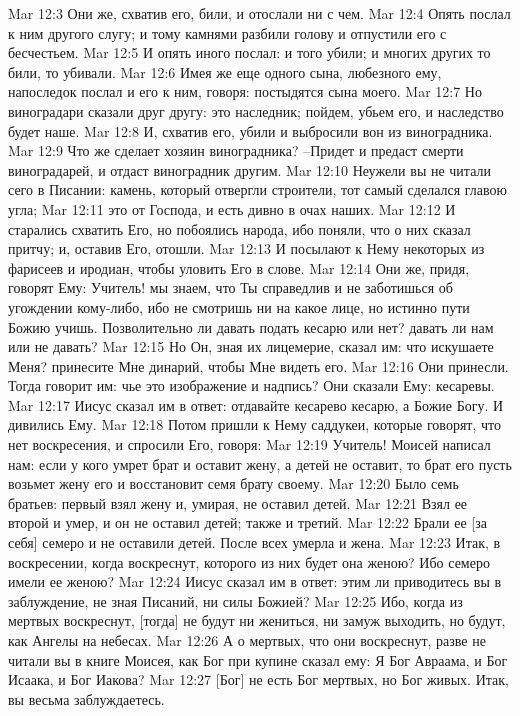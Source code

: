 Mar 12:3  Они же, схватив его, били, и отослали ни с чем.
Mar 12:4  Опять послал к ним другого слугу; и тому камнями разбили голову и отпустили его с бесчестьем.
Mar 12:5  И опять иного послал: и того убили; и многих других то били, то убивали.
Mar 12:6  Имея же еще одного сына, любезного ему, напоследок послал и его к ним, говоря: постыдятся сына моего.
Mar 12:7  Но виноградари сказали друг другу: это наследник; пойдем, убьем его, и наследство будет наше.
Mar 12:8  И, схватив его, убили и выбросили вон из виноградника.
Mar 12:9  Что же сделает хозяин виноградника? --Придет и предаст смерти виноградарей, и отдаст виноградник другим.
Mar 12:10  Неужели вы не читали сего в Писании: камень, который отвергли строители, тот самый сделался главою угла;
Mar 12:11  это от Господа, и есть дивно в очах наших.
Mar 12:12  И старались схватить Его, но побоялись народа, ибо поняли, что о них сказал притчу; и, оставив Его, отошли.
Mar 12:13  И посылают к Нему некоторых из фарисеев и иродиан, чтобы уловить Его в слове.
Mar 12:14  Они же, придя, говорят Ему: Учитель! мы знаем, что Ты справедлив и не заботишься об угождении кому-либо, ибо не смотришь ни на какое лице, но истинно пути Божию учишь. Позволительно ли давать подать кесарю или нет? давать ли нам или не давать?
Mar 12:15  Но Он, зная их лицемерие, сказал им: что искушаете Меня? принесите Мне динарий, чтобы Мне видеть его.
Mar 12:16  Они принесли. Тогда говорит им: чье это изображение и надпись? Они сказали Ему: кесаревы.
Mar 12:17  Иисус сказал им в ответ: отдавайте кесарево кесарю, а Божие Богу. И дивились Ему.
Mar 12:18  Потом пришли к Нему саддукеи, которые говорят, что нет воскресения, и спросили Его, говоря:
Mar 12:19  Учитель! Моисей написал нам: если у кого умрет брат и оставит жену, а детей не оставит, то брат его пусть возьмет жену его и восстановит семя брату своему.
Mar 12:20  Было семь братьев: первый взял жену и, умирая, не оставил детей.
Mar 12:21  Взял ее второй и умер, и он не оставил детей; также и третий.
Mar 12:22  Брали ее [за себя] семеро и не оставили детей. После всех умерла и жена.
Mar 12:23  Итак, в воскресении, когда воскреснут, которого из них будет она женою? Ибо семеро имели ее женою?
Mar 12:24  Иисус сказал им в ответ: этим ли приводитесь вы в заблуждение, не зная Писаний, ни силы Божией?
Mar 12:25  Ибо, когда из мертвых воскреснут, [тогда] не будут ни жениться, ни замуж выходить, но будут, как Ангелы на небесах.
Mar 12:26  А о мертвых, что они воскреснут, разве не читали вы в книге Моисея, как Бог при купине сказал ему: Я Бог Авраама, и Бог Исаака, и Бог Иакова?
Mar 12:27  [Бог] не есть Бог мертвых, но Бог живых. Итак, вы весьма заблуждаетесь.
